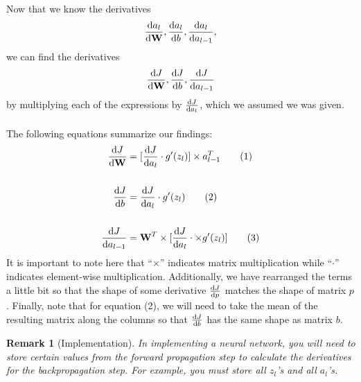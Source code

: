 \documentclass{article}
\newtheorem*{remark}{Remark}
\begin{document}
\\
\\
Now that we know the derivatives
\[\diff{a_l}{\textbf{W}}, \diff{a_l}{b}, \diff{a_l}{a_{l-1}},\]
we can find the derivatives 
\[\diff{J}{\textbf{W}}, \diff{J}{b}, \diff{J}{a_{l-1}}\]
by multiplying each of the expressions by $\diff{J}{a_l}$, which we assumed we was given.
\\
\\
The following equations summarize our findings:
\begin{align*}
    \diff{J}{\textbf{W}} &= [\diff{J}{a_l} \cdot g'(z_l)] \times a_{l-1}^T\tag{1}\\\\
    \diff{J}{b}&=\diff{J}{a_l} \cdot g'(z_l)\tag{2}\\\\
    \diff{J}{a_{l-1}}&= \textbf{W}^T\times [\diff{J}{a_l}\cdot \times g'(z_l)]\tag{3}
\end{align*}
It is important to note here that ``$\times$'' indicates matrix multiplication while ``$\cdot$'' indicates element-wise multiplication. Additionally, we have rearranged the terms a little bit so that the shape of some derivative $\diff{J}{p}$ matches the shape of matrix $p$. Finally, note that for equation (2), we will need to take the mean of the resulting matrix along the columns so that $\diff{J}{b}$ has the same shape as matrix $b$. 

\begin{remark}[Implementation]
In implementing a neural network, you will need to store certain values from the forward propagation step to calculate the derivatives for the backpropagation step. For example, you must store all $z_l$'s and all $a_l$'s.
\end{remark}
\end{document}
